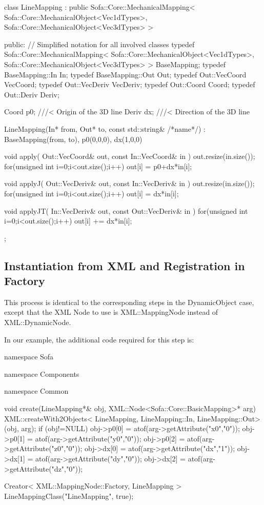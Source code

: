 \begin{code_cpp}
class LineMapping : public Sofa::Core::MechanicalMapping< Sofa::Core::MechanicalObject<Vec1dTypes>, Sofa::Core::MechanicalObject<Vec3dTypes> >
{
public:
  // Simplified notation for all involved classes
  typedef Sofa::Core::MechanicalMapping< Sofa::Core::MechanicalObject<Vec1dTypes>, Sofa::Core::MechanicalObject<Vec3dTypes> > BaseMapping;
  typedef BaseMapping::In In;
  typedef BaseMapping::Out Out;
  typedef Out::VecCoord VecCoord;
  typedef Out::VecDeriv VecDeriv;
  typedef Out::Coord Coord;
  typedef Out::Deriv Deriv;

  Coord p0; ///< Origin of the 3D line
  Deriv dx; ///< Direction of the 3D line
  
  LineMapping(In* from, Out* to, const std::string& /*name*/)
  : BaseMapping(from, to), p0(0,0,0), dx(1,0,0)
  {
  }
  
  void apply( Out::VecCoord& out, const In::VecCoord& in )
  {
    out.resize(in.size());
    for(unsigned int i=0;i<out.size();i++)
      out[i] = p0+dx*in[i];
  }
  
  void applyJ( Out::VecDeriv& out, const In::VecDeriv& in )
  {
    out.resize(in.size());
    for(unsigned int i=0;i<out.size();i++)
      out[i] = dx*in[i];
  }
  
  void applyJT( In::VecDeriv& out, const Out::VecDeriv& in )
  {
    for(unsigned int i=0;i<out.size();i++)
      out[i] += dx*in[i];
  }
};
\end{code_cpp}

\subsection{Instantiation from XML and Registration in Factory}

This process is identical to the corresponding steps in the DynamicObject case, except that the XML Node to use is XML::MappingNode instead of XML::DynamicNode.

In our example, the additional code required for this step is:
\begin{code_cpp}

namespace Sofa { namespace Components { namespace Common {

void create(LineMapping*& obj, XML::Node<Sofa::Core::BasicMapping>* arg)
{
  XML::createWith2Objects< LineMapping, LineMapping::In, LineMapping::Out>(obj, arg);
  if (obj!=NULL)
  {
    obj->p0[0] = atof(arg->getAttribute("x0","0"));
    obj->p0[1] = atof(arg->getAttribute("y0","0"));
    obj->p0[2] = atof(arg->getAttribute("z0","0"));
    obj->dx[0] = atof(arg->getAttribute("dx","1"));
    obj->dx[1] = atof(arg->getAttribute("dy","0"));
    obj->dx[2] = atof(arg->getAttribute("dz","0"));
  }
} } } }

Creator< XML::MappingNode::Factory, LineMapping > LineMappingClass("LineMapping", true);
\end{code_cpp}


